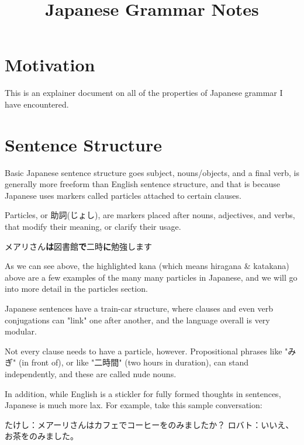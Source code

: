 \documentclass{article}
\title{Japanese Grammar Notes}
\begin{document}
\maketitle

\begin{CJK}{UTF8}{min}

\section{Motivation}
This is an explainer document on all of the properties of Japanese grammar I have encountered.
\section{Sentence Structure}
Basic Japanese sentence structure goes subject, nouns/objects, and a final verb, is generally more freeform than English sentence structure, and that is because Japanese uses markers called particles attached to certain clauses.

\begin{definition}[Particles]
Particles, or 助詞(じょし), are markers placed after nouns, adjectives, and verbs, that modify their meaning, or clarify their usage.
\end{definition}

\begin{example}
メアリさん\textbf{は}図書館\textbf{で}二時\textbf{に}勉強します
\end{example}
As we can see above, the highlighted kana (which means hiragana \& katakana) above are a few examples of the many many particles in Japanese, and we will go into more detail in the particles section. 

Japanese sentences have a train-car structure, where clauses and even verb conjugations can "link" one after another, and the language overall is very modular. 

Not every clause needs to have a particle, however. Propositional phrases like "みぎ" (in front of), or like "二時間" (two hours in duration), can stand independently, and these are called nude nouns.

In addition, while English is a stickler for fully formed thoughts in sentences, Japanese is much more lax. For example, take this sample conversation:

\begin{example}
たけし：メアーリさんはカフェでコーヒーをのみましたか？
ロバト：いいえ、お茶をのみました。
\end{example}


\end{CJK}
\end{document}
